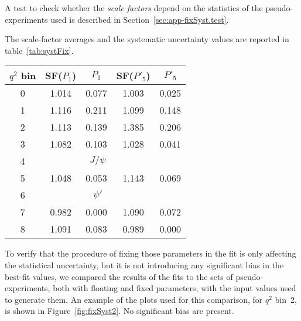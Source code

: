 A test to check whether the \textit{scale factors} depend on the statistics of the pseudo-experiments used is described in Section~\ref{sec:app-fixSyst.test}.

The scale-factor averages and the systematic uncertainty values are reported in table~\ref{tab:systFix}.

\begin{table*}[!htb]
      \caption{Scale-factor average values and systematic uncertainties computed to compensate the statistical error reduction introduced fixing some PDF parameters\label{tab:systFix}}
  \begin{center}
        \begin{tabular}{c|cccc}
             $q^2$ bin & SF($P_1$)  & $P_1$  & SF($P'_5$) & $P'_5$ \\
            \hline
            0  &  1.014 & 0.077 & 1.003 & 0.025  \\
            1  &  1.116 & 0.211 & 1.099 & 0.148  \\
            2  &  1.113 & 0.139 & 1.385 & 0.206  \\
            3  &  1.082 & 0.103 & 1.028 & 0.041  \\
            4  &  \multicolumn{3}{c}{$J/\psi$} \\
            5  &  1.048 & 0.053 & 1.143 & 0.069  \\
            6  &  \multicolumn{3}{c}{$\psi'$}  \\
            7  &  0.982 & 0.000 & 1.090 & 0.072  \\
            8  &  1.091 & 0.083 & 0.989 & 0.000  \\
        \end{tabular}
  \end{center}
\end{table*}

To verify that the procedure of fixing those parameters in the fit is only affecting the statistical uncertainty, but it is not introducing any significant bias in the best-fit values, we compared the results of the fits to the sets of pseudo-experiments, both with floating and fixed parameters, with the input values used to generate them.
An example of the plots used for this comparison, for $q^2$ bin~2, is shown in Figure~\ref{fig:fixSyst2}.
No significant bias are present.


